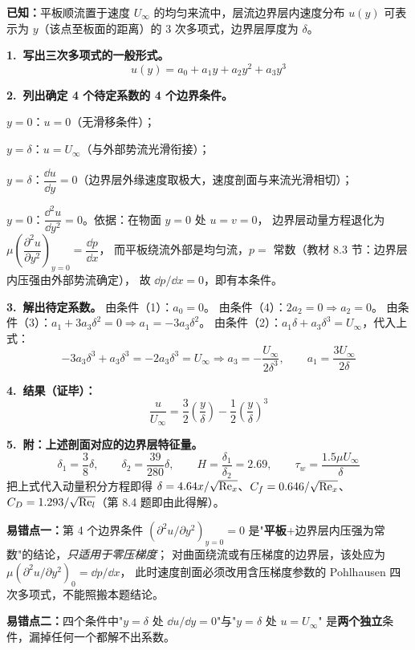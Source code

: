 \begin{jie}
\textbf{已知：}平板顺流置于速度 $U_\infty$ 的均匀来流中，层流边界层内速度分布
$u(y)$ 可表示为 $y$（该点至板面的距离）的 3 次多项式，边界层厚度为 $\delta$。

\textbf{1.\ 写出三次多项式的一般形式。}
\[
u(y)=a_0+a_1y+a_2y^2+a_3y^3
\]

\textbf{2.\ 列出确定 4 个待定系数的 4 个边界条件。}
\begin{xiaowen}
\item $y=0$：$u=0$（无滑移条件）；
\item $y=\delta$：$u=U_\infty$（与外部势流光滑衔接）；
\item $y=\delta$：$\dfrac{\dd u}{\dd y}=0$（边界层外缘速度取极大，速度剖面与来流光滑相切）；
\item $y=0$：$\dfrac{\dd^2u}{\dd y^2}=0$。依据：在物面 $y=0$ 处 $u=v=0$，
边界层动量方程退化为 $\mu\left(\dfrac{\partial^2u}{\partial y^2}\right)_{y=0}=\dfrac{\dd p}{\dd x}$，
而平板绕流外部是均匀流，$p=$ 常数（教材 8.3 节：边界层内压强由外部势流确定），
故 $\dd p/\dd x=0$，即有本条件。
\end{xiaowen}

\textbf{3.\ 解出待定系数。}
由条件（1）：$a_0=0$。
由条件（4）：$2a_2=0\Rightarrow a_2=0$。
由条件（3）：$a_1+3a_3\delta^2=0\Rightarrow a_1=-3a_3\delta^2$。
由条件（2）：$a_1\delta+a_3\delta^3=U_\infty$，代入上式：
\[
-3a_3\delta^3+a_3\delta^3=-2a_3\delta^3=U_\infty
\Rightarrow a_3=-\frac{U_\infty}{2\delta^3},
\qquad a_1=\frac{3U_\infty}{2\delta}
\]

\textbf{4.\ 结果（证毕）：}
\[
\boxed{\,\frac{u}{U_\infty}=\frac{3}{2}\left(\frac{y}{\delta}\right)-\frac{1}{2}\left(\frac{y}{\delta}\right)^3\,}
\]

\textbf{5.\ 附：上述剖面对应的边界层特征量。}
\[
\delta_1=\frac{3}{8}\delta,\qquad
\delta_2=\frac{39}{280}\delta,\qquad
H=\frac{\delta_1}{\delta_2}=2.69,\qquad
\tau_w=\frac{1.5\mu U_\infty}{\delta}
\]
把上式代入动量积分方程即得 $\delta=4.64x/\sqrt{\mathrm{Re}_x}$、$C_f=0.646/\sqrt{\mathrm{Re}_x}$、
$C_D=1.293/\sqrt{\mathrm{Re}_l}$（第 8.4 题即由此得解）。
\end{jie}

\begin{yicuo}
\textbf{易错点一：}第 4 个边界条件 $\left(\partial^2u/\partial y^2\right)_{y=0}=0$
是"\textbf{平板}+边界层内压强为常数"的结论，\emph{只适用于零压梯度}；
对曲面绕流或有压梯度的边界层，该处应为 $\mu(\partial^2u/\partial y^2)_0=\dd p/\dd x$，
此时速度剖面必须改用含压梯度参数的 Pohlhausen 四次多项式，不能照搬本题结论。

\textbf{易错点二：}四个条件中"$y=\delta$ 处 $\dd u/\dd y=0$"与"$y=\delta$ 处 $u=U_\infty$"
是\textbf{两个独立}条件，漏掉任何一个都解不出系数。
\end{yicuo}

